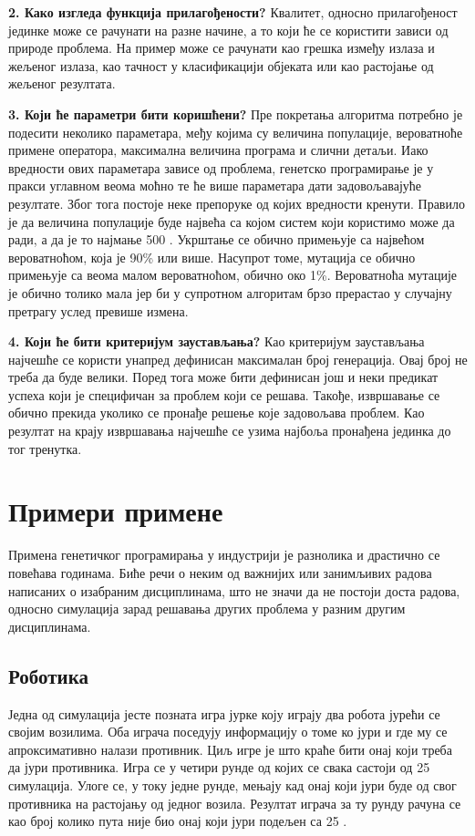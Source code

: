 \documentclass[a4paper]{article}
\begin{document}
\textbf{2. Како изгледа функција прилагођености?}\newline
Квалитет, односно прилагођеност јединке може се рачунати на разне начине, а то који ће се користити зависи од природе проблема. На пример може се рачунати као грешка између излаза и жељеног излаза, као тачност у класификацији објеката или као растојање од жељеног резултата.\newline

\textbf{3. Који ће параметри бити коришћени?}\newline
Пре покретања алгоритма потребно је подесити неколико параметара, међу којима су величина популације, вероватноће примене оператора, максимална величина програма и слични детаљи. Иако вредности ових параметара зависе од проблема, генетско програмирање је у пракси углавном веома моћно те ће више параметара дати задовољавајуће резултате. Због тога постоје неке препоруке од којих вредности кренути. Правило је да величина популације буде највећа са којом систем који користимо може да ради, а да је то најмање 500 \cite{fieldGuidetoGP}. Укрштање се обично примењује са највећом вероватноћом, која је 90\% или више. Насупрот томе, мутација се обично примењује са веома малом вероватноћом, обично око 1\%. Вероватноћа мутације је обично толико мала јер би у супротном алгоритам брзо прерастао у случајну претрагу услед превише измена.\newline

\textbf{4. Који ће бити критеријум заустављања?}\newline
Као критеријум заустављања најчешће се користи унапред дефинисан максималан број генерација. Овај број не треба да буде велики. Поред тога може бити дефинисан још и неки предикат успеха који је специфичан за проблем који се решава. Такође, извршавање се обично прекида уколико се пронађе решење које задовољава проблем. Као резултат на крају извршавања најчешће се узима најбоља пронађена јединка до тог тренутка.

\section{Примери примене}
Примена генетичког програмирања у индустрији је разнолика и драстично се повећава годинама. Биће речи о неким од важнијих или занимљивих радова написаних о изабраним дисциплинама, што не значи да не постоји доста радова, односно симулација зарад решавања других проблема у разним другим дисциплинама.
\subsection{Роботика}
Једна од симулација јесте позната игра јурке коју играју два робота јурећи се својим возилима. Оба играча поседују информацију о томе ко јури и где му се апроксимативно налази противник. Циљ игре је што краће бити онај који треба да јури противника. Игра се у четири рунде од којих се свака састоји од 25 симулација. Улоге се, у току једне рунде, мењају кад онај који јури буде од свог противника на растојању од једног возила. Резултат играча за ту рунду рачуна се као број колико пута није био онај који јури подељен са 25 \cite{tag}.
\end{document}
